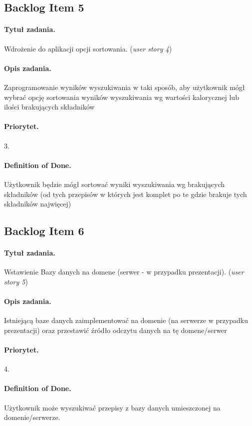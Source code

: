 \documentclass[a4paper]{article}
\begin{document}
	\subsection{Backlog Item 5}
	\paragraph{Tytuł zadania.} Wdrożenie do aplikacji opcji sortowania. (\textit{user story 4})
	\paragraph{Opis zadania.} Zaprogramowanie wyników wyszukiwania w taki sposób, aby użytkownik mógł wybrać opcję sortowania wyników wyszukiwania wg wartości kalorycznej lub ilości brakujących składników
	\paragraph{Priorytet.} 3.
	\paragraph{Definition of Done.} Użytkownik będzie mógł sortować wyniki wyszukiwania wg brakujących składników (od tych przepisów w których jest komplet po te gdzie brakuje tych składników najwięcej)
	
	\subsection{Backlog Item 6}
	\paragraph{Tytuł zadania.} Wstawienie Bazy danych na domene (serwer - w przypadku prezentacji). (\textit{user story 5})
	\paragraph{Opis zadania.} Istniejącą baze danych zaimplementować na domenie (na serwerze w przypadku prezentacji) oraz przestawić źródło odczytu danych na tę domene/serwer
	\paragraph{Priorytet.} 4.
	\paragraph{Definition of Done.} Użytkownik może wyszukiwać przepisy z bazy danych umieszczonej na domenie/serwerze.
	
\end{document}
